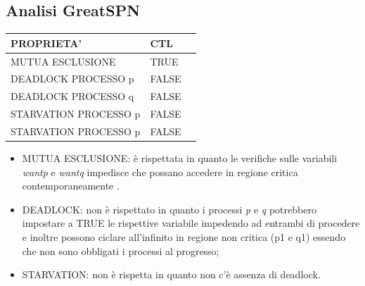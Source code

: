 \documentclass{article}
\begin{document}
\subsection{Analisi GreatSPN}
\begin{tabular}{ |p{6cm}||p{3cm}|p{3cm}|}
 \hline
 PROPRIETA'& CTL\\
 \hline
 MUTUA ESCLUSIONE&TRUE \\
 DEADLOCK PROCESSO p&FALSE \\
 DEADLOCK PROCESSO q&FALSE\\
 STARVATION PROCESSO p&FALSE\\
 STARVATION PROCESSO p&FALSE\\
\hline
\end{tabular}
\begin{itemize}
    \item MUTUA ESCLUSIONE: è rispettata in quanto le verifiche sulle variabili \textit{wantp} e \textit{wantq} impedisce che possano accedere in regione critica contemporaneamente .
    \item DEADLOCK: non è rispettato in quanto i processi \textit{p} e \textit{q} potrebbero impostare a TRUE le rispettive variabile impedendo ad entrambi di procedere e inoltre possono ciclare all'infinito in regione non critica (p1 e q1) essendo che non sono obbligati i processi al progresso;
    \item STARVATION: non è rispetta in quanto non c'è assenza di deadlock.
\end{itemize}
\clearpage
\end{document}
